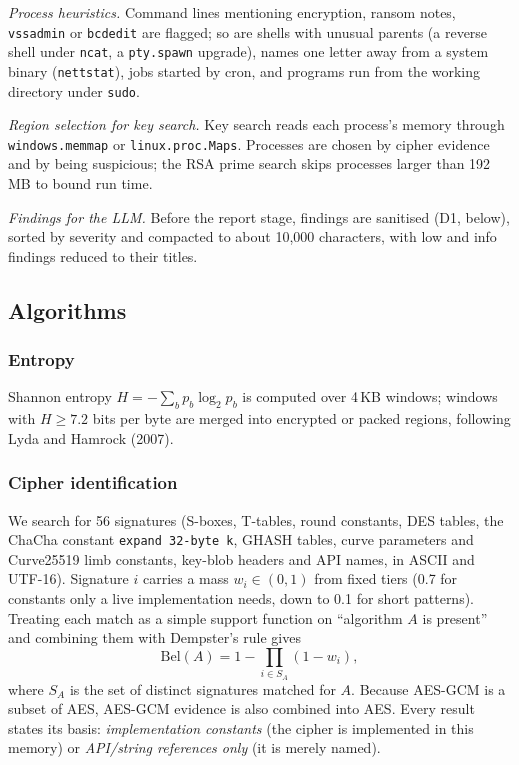 \textit{Process heuristics.} Command lines mentioning encryption, ransom notes, \texttt{vssadmin} or
\texttt{bcdedit} are flagged; so are shells with unusual parents (a reverse shell under \texttt{ncat}, a
\texttt{pty.spawn} upgrade), names one letter away from a system binary (\texttt{nettstat}), jobs started by
cron, and programs run from the working directory under \texttt{sudo}.

\textit{Region selection for key search.} Key search reads each process's memory through
\texttt{windows.memmap} or \texttt{linux.proc.Maps}. Processes are chosen by cipher evidence and by being
suspicious; the RSA prime search skips processes larger than 192\,MB to bound run time.

\textit{Findings for the LLM.} Before the report stage, findings are sanitised (D1, below), sorted by severity
and compacted to about 10{,}000 characters, with low and info findings reduced to their titles.

\subsection{Algorithms}

\subsubsection{Entropy}
Shannon entropy $H=-\sum_b p_b \log_2 p_b$ is computed over 4\,KB windows; windows with $H \ge 7.2$ bits per
byte are merged into encrypted or packed regions, following Lyda and Hamrock (2007).

\subsubsection{Cipher identification}
We search for 56 signatures (S-boxes, T-tables, round constants, DES tables, the ChaCha constant
\texttt{expand 32-byte k}, GHASH tables, curve parameters and Curve25519 limb constants, key-blob headers and API
names, in ASCII and UTF-16). Signature $i$ carries a mass $w_i\in(0,1)$ from fixed tiers (0.7 for constants only
a live implementation needs, down to 0.1 for short patterns). Treating each match as a simple support function
on ``algorithm $A$ is present'' and combining them with Dempster's rule gives
\begin{equation}
  \mathrm{Bel}(A) = 1 - \prod_{i \in S_A} (1 - w_i),
  \label{eq:bel}
\end{equation}
where $S_A$ is the set of distinct signatures matched for $A$. Because AES-GCM is a subset of AES, AES-GCM
evidence is also combined into AES. Every result states its basis: \emph{implementation constants} (the cipher
is implemented in this memory) or \emph{API/string references only} (it is merely named).

